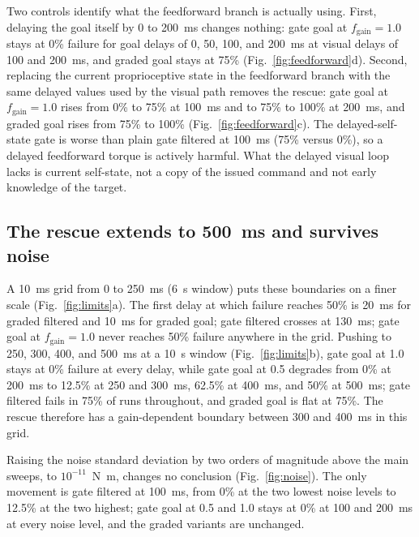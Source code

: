 \documentclass[pdflatex,sn-nature]{sn-jnl}
\begin{document}
Two controls identify what the feedforward branch is actually using. First, delaying the goal itself by 0 to 200~ms changes nothing: gate goal at $f_{\mathrm{gain}} = 1.0$ stays at 0\% failure for goal delays of 0, 50, 100, and 200~ms at visual delays of 100 and 200~ms, and graded goal stays at 75\% (Fig.~\ref{fig:feedforward}d). Second, replacing the current proprioceptive state in the feedforward branch with the same delayed values used by the visual path removes the rescue: gate goal at $f_{\mathrm{gain}} = 1.0$ rises from 0\% to 75\% at 100~ms and to 75\% to 100\% at 200~ms, and graded goal rises from 75\% to 100\% (Fig.~\ref{fig:feedforward}c). The delayed-self-state gate is worse than plain gate filtered at 100~ms (75\% versus 0\%), so a delayed feedforward torque is actively harmful. What the delayed visual loop lacks is current self-state, not a copy of the issued command and not early knowledge of the target.

\subsection{The rescue extends to 500~ms and survives noise}

A 10~ms grid from 0 to 250~ms (6~s window) puts these boundaries on a finer scale (Fig.~\ref{fig:limits}a). The first delay at which failure reaches 50\% is 20~ms for graded filtered and 10~ms for graded goal; gate filtered crosses at 130~ms; gate goal at $f_{\mathrm{gain}} = 1.0$ never reaches 50\% failure anywhere in the grid. Pushing to 250, 300, 400, and 500~ms at a 10~s window (Fig.~\ref{fig:limits}b), gate goal at 1.0 stays at 0\% failure at every delay, while gate goal at 0.5 degrades from 0\% at 200~ms to 12.5\% at 250 and 300~ms, 62.5\% at 400~ms, and 50\% at 500~ms; gate filtered fails in 75\% of runs throughout, and graded goal is flat at 75\%. The rescue therefore has a gain-dependent boundary between 300 and 400~ms in this grid.

Raising the noise standard deviation by two orders of magnitude above the main sweeps, to $10^{-11}$~N~m, changes no conclusion (Fig.~\ref{fig:noise}). The only movement is gate filtered at 100~ms, from 0\% at the two lowest noise levels to 12.5\% at the two highest; gate goal at 0.5 and 1.0 stays at 0\% at 100 and 200~ms at every noise level, and the graded variants are unchanged.
\end{document}
